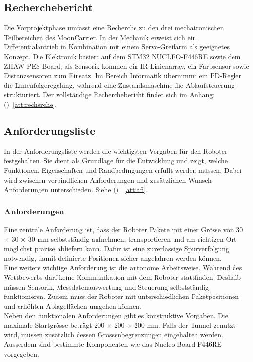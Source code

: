 \documentclass[11pt,a4paper]{article}
\begin{document}
	\newpage
	\subsection{Recherchebericht}
	Die Vorprojektphase umfasst eine Recherche zu den drei mechatronischen Teilbereichen des MoonCarrier. In der Mechanik erweist sich ein Differentialantrieb in Kombination mit einem Servo-Greifarm als geeignetes Konzept. Die Elektronik basiert auf dem STM32 NUCLEO-F446RE sowie dem ZHAW PES Board; als Sensorik kommen ein IR-Linienarray, ein Farbsensor sowie Distanzsensoren zum Einsatz. Im Bereich Informatik übernimmt ein PD-Regler die Linienfolgeregelung, während eine Zustandsmaschine die Ablaufsteuerung strukturiert. Der vollständige Recherchebericht findet sich im Anhang: ()~\ref{att:recherche}.
	
	\newpage
	\subsection{Anforderungsliste}
	In der Anforderungsliste werden die wichtigsten Vorgaben für den Roboter festgehalten. Sie dient als Grundlage für die Entwicklung und zeigt, welche Funktionen, Eigenschaften und Randbedingungen erfüllt werden müssen. Dabei wird zwischen verbindlichen Anforderungen und zusätzlichen Wunsch-Anforderungen unterschieden. Siehe () ~\ref{att:afl}.
	\subsubsection{Anforderungen}
	
	Eine zentrale Anforderung ist, dass der Roboter Pakete mit einer Grösse von 30 \(\times\) 30 \(\times\) 30 mm selbstständig aufnehmen, transportieren und am richtigen Ort möglichst präzise abliefern kann. Dafür ist eine zuverlässige Spurverfolgung notwendig, damit definierte Positionen sicher angefahren werden können.
	\\
	
	\noindent
	Eine weitere wichtige Anforderung ist die autonome Arbeitsweise. Während des Wettbewerbs darf keine Kommunikation mit dem Roboter stattfinden. Deshalb müssen Sensorik, Messdatenauswertung und Steuerung selbstständig funktionieren. Zudem muss der Roboter mit unterschiedlichen Paketpositionen und erhöhten Ablageflächen umgehen können.
	\\
	
	\noindent
	Neben den funktionalen Anforderungen gibt es konstruktive Vorgaben. Die maximale Startgrösse beträgt 200 \(\times\) 200 \(\times\) 200 mm. Falls der Tunnel genutzt wird, müssen zusätzlich dessen Grössenbegrenzungen eingehalten werden. Ausserdem sind bestimmte Komponenten wie das Nucleo-Board F446RE vorgegeben.
	\\
	
\end{document}
